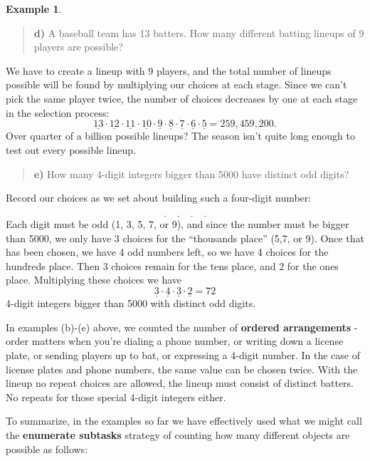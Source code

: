 \documentclass[
]{book}
\theoremstyle{definition}
\theoremstyle{definition}
\newtheorem{example}{Example}[chapter]
\theoremstyle{definition}
\theoremstyle{definition}
\theoremstyle{remark}
\begin{document}
\begin{example}
\begin{quote}
\textbf{d)}
A baseball team has 13 batters. How many different batting lineups of 9 players are possible?
\end{quote}

We have to create a lineup with 9 players, and the total number of lineups possible will be found by multiplying our choices at each stage. Since we can't pick the same player twice, the number of choices decreases by one at each stage in the selection process:
\[\underline{13}\cdot \underline{12} \cdot \underline{11} \cdot \underline{10} \cdot \underline{9} \cdot \underline{8} \cdot \underline{7} \cdot \underline{6} \cdot \underline{5}= 259,459,200.\]
Over quarter of a billion possible lineups? The season isn't quite long enough to test out every possible lineup.

\begin{quote}
\textbf{e)}
How many 4-digit integers bigger than 5000 have distinct odd digits?
\end{quote}

Record our choices as we set about building such a four-digit number:

\[\underline{~~~} ~~~ \underline{~~~} ~~~ \underline{~~~} ~~~ \underline{~~~}\]
Each digit must be odd (1, 3, 5, 7, or 9), and since the number must be bigger than 5000, we only have 3 choices for the ``thousands place'' (5,7, or 9). Once that has been chosen, we have 4 odd numbers left, so we have 4 choices for the hundreds place. Then 3 choices remain for the tens place, and 2 for the ones place. Multiplying these choices we have
\[\underline{3}\cdot \underline{4} \cdot \underline{3} \cdot \underline{2} = 72\] 4-digit integers bigger than 5000 with distinct odd digits.

\end{example}

In examples (b)-(e) above, we counted the number of \textbf{ordered arrangements} - order matters when you're dialing a phone number, or writing down a license plate, or sending players up to bat, or expressing a 4-digit number. In the case of license plates and phone numbers, the same value can be chosen twice. With the lineup no repeat choices are allowed, the lineup must consist of distinct batters. No repeats for those special 4-digit integers either.

To summarize, in the examples so far we have effectively used what we might call the \textbf{enumerate subtasks} strategy of counting how many different objects are possible as follows:
\end{document}
